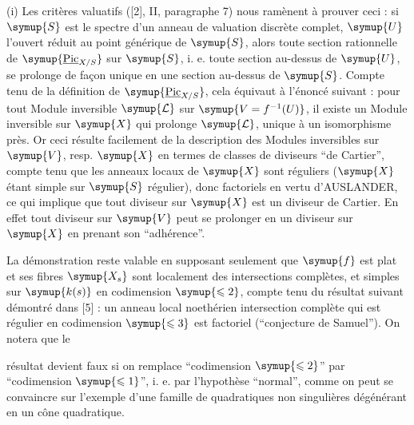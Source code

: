 (i) Les critères valuatifs ([2], II, paragraphe 7) nous ramènent à prouver ceci :
si $\symup{S}$ est le spectre d'un anneau de valuation discrète complet, $\symup{U}$ l'ouvert
réduit au point générique de $\symup{S}$, alors toute section rationnelle de
$\symup{\underline{\operatorname{Pic}}_{X/S}}$ sur $\symup{S}$, i. e. toute section au-dessus de $\symup{U}$, se
prolonge de façon unique en une section au-dessus de $\symup{S}$. Compte tenu de la
définition de $\symup{\underline{\operatorname{Pic}}_{X/S}}$, cela équivaut à l'énoncé suivant :
pour tout Module inversible $\symup{\mathcal L}$ sur $\symup{V=f^{-1}(U)}$, il existe un Module
inversible sur $\symup{X}$ qui prolonge $\symup{\mathcal L}$, unique à un isomorphisme près. Or
ceci résulte facilement de la description des Modules inversibles sur $\symup{V}$,
resp. $\symup{X}$ en termes de classes de diviseurs ``de Cartier'', compte tenu que
les anneaux locaux de $\symup{X}$ sont réguliers ($\symup{X}$ étant simple sur $\symup{S}$ régulier),
donc factoriels en vertu d'AUSLANDER, ce qui implique que tout diviseur sur
$\symup{X}$ est un diviseur de Cartier. En effet tout diviseur sur $\symup{V}$ peut se prolonger en un diviseur sur $\symup{X}$ en prenant son
``adhérence''.


 La démonstration reste valable en supposant seulement
que $\symup{f}$ est plat et ses fibres $\symup{X_s}$ sont localement des intersections
complètes, et simples sur $\symup{k(s)}$ en codimension $\symup{\leqslant2}$, compte tenu du résultat
suivant démontré dans [5] : un anneau local noethérien intersection complète
qui est régulier en codimension $\symup{\leqslant3}$ est factoriel (``conjecture de Samuel'').
On notera que le

résultat devient faux si on remplace ``codimension $\symup{\leqslant2}$'' par ``codimension $\symup{\leqslant1}$'', i. e. par l'hypothèse ``normal'', comme on peut se convaincre sur
l'exemple d'une famille de quadratiques non singulières dégénérant en un cône
quadratique.

